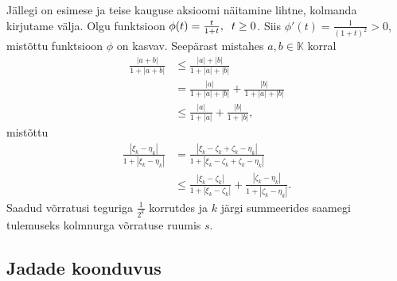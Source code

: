 \documentclass{article}[12pt]
\newcommand{\h}{\hspace{0.2cm}}
\newcommand{\K}{\mathbb{K}}
\theoremstyle{definition}
\theoremstyle{definition}
\theoremstyle{definition}
\begin{document}
\begin{enumerate}
	Jällegi on esimese ja teise kauguse aksioomi näitamine lihtne, kolmanda kirjutame välja.
	Olgu funktsioon $\phi(t) = \frac{t}{1+t},\h t\geq 0$. Siis $\phi'(t) = \frac{1}{(1+t)^2}>0$, mistõttu funktsioon $\phi$ on kasvav. 
	Seepärast mistahes $a,b\in\K$ korral
	\begin{align*}
		\frac{ |a+b| }{ 1+|a+b| } &\leq \frac{ |a|+|b| }{ 1+|a|+|b| } \\
		&= \frac{ |a| }{ 1+|a|+|b| } + \frac{ |b| }{ 1+|a|+|b| } \\
		&\leq \frac{ |a| }{ 1+|a| } + \frac{ |b| }{ 1+|b| },
	\end{align*}
	mistõttu
	\begin{align*}
		\frac{ |\xi_k-\eta_k| }{ 1+|\xi_k-\eta_k| } &= \frac{ |\xi_k-\zeta_k+\zeta_k-\eta_k| }{ 1+|\xi_k-\zeta_k+\zeta_k-\eta_k| } \\
		&\leq \frac{ |\xi_k-\zeta_k| }{ 1+|\xi_k-\zeta_k| } + \frac{ |\zeta_k-\eta_k| }{ 1+|\zeta_k-\eta_k| }.
	\end{align*}
	Saadud võrratusi teguriga $\frac{1}{2^k}$ korrutdes ja $k$ järgi summeerides saamegi tulemuseks kolmnurga võrratuse ruumis $s$.
\end{enumerate}

\subsection*{Jadade koonduvus}
\end{document}

